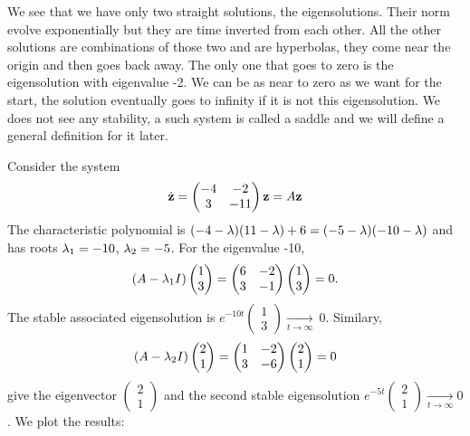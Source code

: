 \begin{exemple}[saddle]
We see that we have only two straight solutions, the eigensolutions. Their norm evolve exponentially but they are time inverted from each other. All the other solutions are combinations of those two and are hyperbolas, they come near the origin and then goes back away. The only one that goes to zero is the eigensolution with eigenvalue -2. We can be as near to zero as we want for the start, the solution eventually goes to infinity if it is not this eigensolution. We does not see any stability, a such system is called a saddle and we will define a general definition for it later.
\end{exemple}

\begin{exemple}[focus]
Consider the system
$$ \dot{\mathbf{z}}=
\begin{pmatrix} -4&-2\\3&-11 \end{pmatrix}\mathbf{z} =A\mathbf{z}
$$
The characteristic polynomial is $(-4-\lambda)(11-\lambda)+6=(-5-\lambda)(-10-\lambda)$ and has roots $\lambda_1=-10$, $\lambda_2=-5$. For the eigenvalue -10, $$ (A-\lambda_1I)\begin{pmatrix}1\\3\end{pmatrix}
= \begin{pmatrix}6&-2\\3&-1\end{pmatrix} \begin{pmatrix}1\\3\end{pmatrix} = 0.$$
The stable associated eigensolution is $e^{-10t}\begin{pmatrix}1\\3\end{pmatrix} \xrightarrow[t\to\infty]{}~0$. Similary, 
$$ (A-\lambda_2I)\begin{pmatrix}2\\1\end{pmatrix}
= \begin{pmatrix} 1&-2\\3&-6 \end{pmatrix} \begin{pmatrix}2\\1\end{pmatrix} = 0$$
give the eigenvector $\begin{pmatrix}2\\1\end{pmatrix}$ and the second stable eigensolution $e^{-5t}\begin{pmatrix}2\\1\end{pmatrix}\xrightarrow[t\to\infty]~0$. We plot the results:

\end{exemple}
